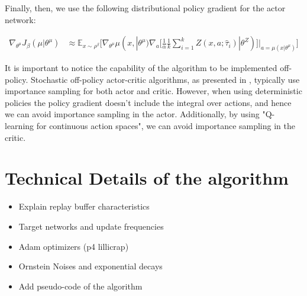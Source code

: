 Finally, then, we use the following distributional policy gradient for the actor network:

\begin{align}
    \nabla_{\theta^\mu} J_\beta(\mu | \theta^\mu) &\approx \mathbb E_{x \sim \rho^\beta} 
    \big [\nabla_{\theta^\mu} \mu(x,| \theta^\mu) \nabla_a  [\frac{1}{\alpha} \frac{1}{k}
    \sum_{i=1}^kZ(x,a; \hat\tau_i) | \theta^Z)]|_{a=\mu(x| \theta^\mu)}  \big]
    \label{eq:actor_grad}
\end{align}

It is important to notice the capability of the algorithm to be implemented off-policy.
Stochastic off-policy actor-critic algorithms, as presented in \citet{Degris2012}, typically
use importance sampling for both actor and critic. 
However, when using deterministic policies the policy gradient doesn't include the integral over actions,
and hence we can avoid importance sampling in the actor.
Additionally, by using "Q-learning for continuous action spaces", we can avoid importance sampling in the critic.


\section{Technical Details of the algorithm}


\begin{itemize}
    \item Explain replay buffer characteristics
    \item Target networks and update frequencies
    \item Adam optimizers (p4 lillicrap)
	\item Ornstein Noises and exponential decays
	\item Add pseudo-code of the algorithm 
\end{itemize}














